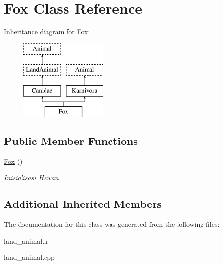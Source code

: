 \hypertarget{class_fox}{}\section{Fox Class Reference}
\label{class_fox}
Inheritance diagram for Fox\+:\begin{figure}[H]
\begin{center}
\leavevmode
\includegraphics[height=4.000000cm]{class_fox}
\end{center}
\end{figure}
\subsection*{Public Member Functions}
\begin{DoxyCompactItemize}
\item 
\hyperlink{class_fox_a2a27c4d3fa7cd34de916cc6ed0405a47}{Fox} ()\hypertarget{class_fox_a2a27c4d3fa7cd34de916cc6ed0405a47}{}\label{class_fox_a2a27c4d3fa7cd34de916cc6ed0405a47}

\begin{DoxyCompactList}\small\item\em Inisialisasi Hewan. \end{DoxyCompactList}\end{DoxyCompactItemize}
\subsection*{Additional Inherited Members}


The documentation for this class was generated from the following files\+:\begin{DoxyCompactItemize}
\item 
land\+\_\+animal.\+h\item 
land\+\_\+animal.\+cpp\end{DoxyCompactItemize}
